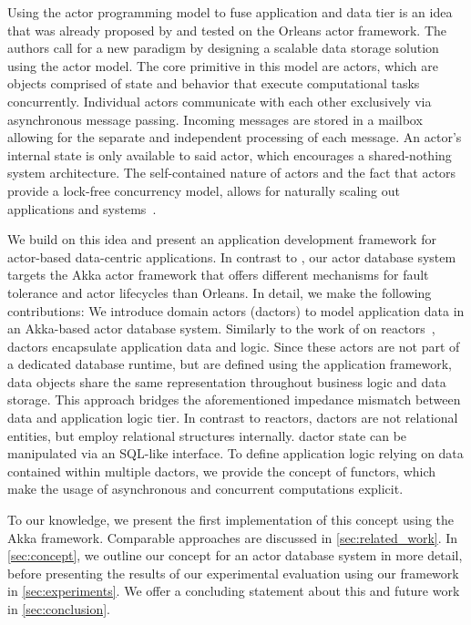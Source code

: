   Using the actor programming model to fuse application and data tier is an idea that was already proposed by \citet{manifesto} and tested on the Orleans actor framework.
  The authors call for a new paradigm by designing a scalable data storage solution using the actor model.
  The core primitive in this model are actors, which are objects comprised of state and behavior that execute computational tasks concurrently.
  Individual actors communicate with each other exclusively via asynchronous message passing.
  Incoming messages are stored in a mailbox allowing for the separate and independent processing of each message.
  An actor's internal state is only available to said actor, which encourages a shared-nothing system architecture.
  The self-contained nature of actors and the fact that actors provide a lock-free concurrency model, allows for naturally scaling out applications and systems~\cite{vernon2015reactive}.
  

  We build on this idea and present an application development framework for actor-based data-centric applications.
  In contrast to \citet{manifesto}, our actor database system targets the Akka actor framework that offers different mechanisms for fault tolerance and actor lifecycles than Orleans.
  In detail, we make the following contributions:
  We introduce domain actors (\glspl{dactor}) to model application data in an Akka-based actor database system.
  Similarly to the work of \citeauthor{Shah:reactdb} on reactors~\cite{Shah:reactdb}, \glspl{dactor} encapsulate application data and logic.
  Since these actors are not part of a dedicated database runtime, but are defined using the application framework, data objects share the same representation throughout business logic and data storage.
  This approach bridges the aforementioned impedance mismatch between data and application logic tier.
  In contrast to reactors, \glspl{dactor} are not relational entities, but employ relational structures internally.
  \Gls{dactor} state can be manipulated via an SQL-like interface.
  To define application logic relying on data contained within multiple \glspl{dactor}, we provide the concept of \glspl{functor}, which make the usage of asynchronous and concurrent computations explicit.

  To our knowledge, we present the first implementation of this concept using the Akka framework.
  Comparable approaches are discussed in \cref{sec:related_work}.
  In \cref{sec:concept}, we outline our concept for an actor database system in more detail,
  before presenting the results of our experimental evaluation using our framework in \cref{sec:experiments}.
  We offer a concluding statement about this and future work in \cref{sec:conclusion}.
  
